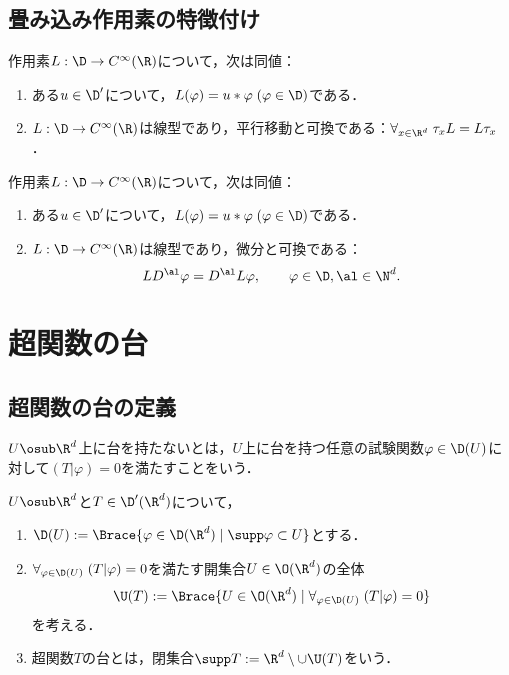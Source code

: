 \documentclass[uplatex,dvipdfmx]{jsreport}
\begin{document}
\subsection{畳み込み作用素の特徴付け}

\begin{theorem}
    作用素$L:\D\to C^\infty(\R)$について，次は同値：
    \begin{enumerate}
        \item ある$u\in\D'$について，$L(\varphi)=u*\varphi\;(\varphi\in\D)$である．
        \item $L:\D\to C^\infty(\R)$は線型であり，平行移動と可換である：$\forall_{x\in\R^d}\;\tau_xL=L\tau_x$．
    \end{enumerate}
\end{theorem}

\begin{theorem}
    作用素$L:\D\to C^\infty(\R)$について，次は同値：
    \begin{enumerate}
        \item ある$u\in\D'$について，$L(\varphi)=u*\varphi\;(\varphi\in\D)$である．
        \item $L:\D\to C^\infty(\R)$は線型であり，微分と可換である：
        \[LD^\al\varphi=D^\al L\varphi,\qquad\varphi\in\D,\al\in\N^d.\]
    \end{enumerate}
\end{theorem}

\section{超関数の台}

\subsection{超関数の台の定義}

\begin{tcolorbox}[colframe=ForestGreen, colback=ForestGreen!10!white,breakable,colbacktitle=ForestGreen!40!white,coltitle=black,fonttitle=\bfseries\sffamily,
title=]
    $U\osub\R^d$上に台を持たないとは，$U$上に台を持つ任意の試験関数$\varphi\in\D(U)$に対して$(T|\varphi)=0$を満たすことをいう．
\end{tcolorbox}

\begin{definition}
    $U\osub\R^d$と$T\in\D'(\R^d)$について，
    \begin{enumerate}
        \item $\D(U):=\Brace{\varphi\in\D(\R^d)\mid\supp\varphi\subset U}$とする．
        \item $\forall_{\varphi\in\D(U)}\;(T|\varphi)=0$を満たす開集合$U\in\O(\R^d)$の全体
        \[\U(T):=\Brace{U\in\O(\R^d)\mid\forall_{\varphi\in\D(U)}\;(T|\varphi)=0}\]
        を考える．
        \item 超関数$T$の台とは，閉集合$\supp T:=\R^d\setminus\cup\U(T)$をいう．
    \end{enumerate}
\end{definition}
\end{document}
